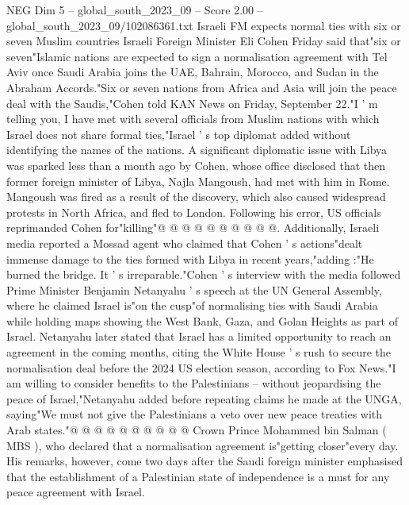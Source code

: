 \begin{textsample}{NEG Dim 5 – global\_south\_2023\_09 – Score 2.00 – global\_south\_2023\_09/102086361.txt}  \label{ex:f5_neg_033}
Israeli FM expects normal ties with six or seven Muslim countries Israeli Foreign Minister Eli Cohen Friday said that"six or seven"Islamic nations are expected to sign a normalisation agreement with Tel Aviv once Saudi Arabia joins the UAE, Bahrain, Morocco, and Sudan in the Abraham Accords."Six or seven nations from Africa and Asia will join the peace deal with the Saudis,"Cohen told KAN News on Friday, September 22."I ' m telling you, I have met with several officials from Muslim nations with which Israel does not share formal ties,"Israel ' s top diplomat added without identifying the names of the nations.
A significant diplomatic issue with Libya was sparked less than a month ago by Cohen, whose office disclosed that then former foreign minister of Libya, Najla Mangoush, had met with him in Rome.
Mangoush was fired as a result of the discovery, which also caused widespread protests in North Africa, and fled to London.
Following his error, US officials reprimanded Cohen for"killing"@ @ @ @ @ @ @ @ @ @.
Additionally, Israeli media reported a Mossad agent who claimed that Cohen ' s actions"dealt immense damage to the ties formed with Libya in recent years,"adding :"He burned the bridge.
It ' s irreparable."Cohen ' s interview with the media followed Prime Minister Benjamin Netanyahu ' s speech at the UN General Assembly, where he claimed Israel is"on the cusp"of normalising ties with Saudi Arabia while holding maps showing the West Bank, Gaza, and Golan Heights as part of Israel.
Netanyahu later stated that Israel has a limited opportunity to reach an agreement in the coming months, citing the White House ' s rush to secure the normalisation deal before the 2024 US election season, according to Fox News."I am willing to consider benefits to the Palestinians -- without jeopardising the peace of Israel,"Netanyahu added before repeating claims he made at the UNGA, saying"We must not give the Palestinians a veto over new peace treaties with Arab states."@ @ @ @ @ @ @ @ @ @ Crown Prince Mohammed bin Salman ( MBS ), who declared that a normalisation agreement is"getting closer"every day.
His remarks, however, come two days after the Saudi foreign minister emphasised that the establishment of a Palestinian state of independence is a must for any peace agreement with Israel.

\end{textsample}
